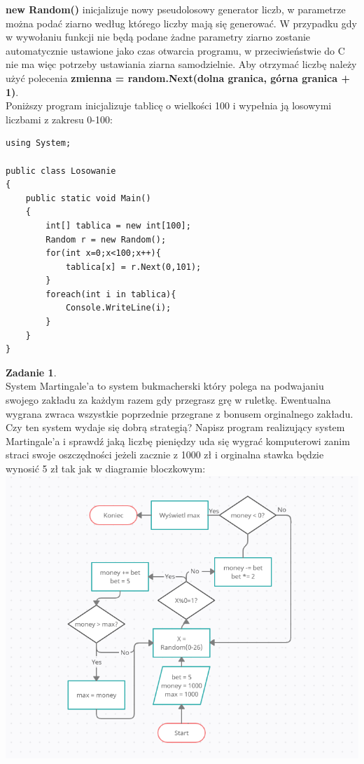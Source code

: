 \documentclass[a4paper]{article}
\theoremstyle{definition}
\newtheorem{zadanie}[theorem]{Zadanie}
\begin{document}
\textbf{new Random()} inicjalizuje nowy pseudolosowy generator liczb, w parametrze można podać ziarno według którego liczby mają się generować. W przypadku gdy w wywołaniu funkcji nie będą podane żadne parametry ziarno zostanie automatycznie ustawione jako czas otwarcia programu, w przeciwieństwie do C nie ma więc potrzeby ustawiania ziarna samodzielnie.
Aby otrzymać liczbę należy użyć polecenia \textbf{zmienna = random.Next(dolna granica, górna granica + 1)}.
\\Poniższy program inicjalizuje tablicę o wielkości 100 i wypełnia ją losowymi liczbami z zakresu 0-100:\\\begin{lstlisting}[frame=single]
using System;

public class Losowanie
{
    public static void Main()
    {
        int[] tablica = new int[100];
        Random r = new Random();
        for(int x=0;x<100;x++){
            tablica[x] = r.Next(0,101);
        }
        foreach(int i in tablica){
            Console.WriteLine(i);
        }
    }
}
\end{lstlisting}
\begin{zadanie}
\\System Martingale'a to system bukmacherski który polega na podwajaniu swojego zakładu za każdym razem gdy przegrasz grę w ruletkę. Ewentualna wygrana zwraca wszystkie poprzednie przegrane z bonusem orginalnego zakładu.
\\Czy ten system wydaje się dobrą strategią? Napisz program realizujący system Martingale'a i sprawdź jaką liczbę pieniędzy uda się wygrać komputerowi zanim straci swoje oszczędności jeżeli zacznie z 1000 zł i orginalna stawka będzie wynosić 5 zł tak jak w diagramie bloczkowym:
\\\includegraphics[scale=0.85]{bloczki}
\end{zadanie}
\pagebreak
\end{document}
